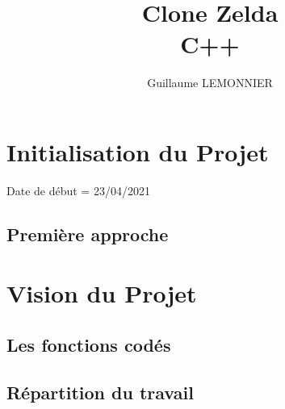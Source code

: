 \documentclass[a4paper,12pt]{article} %
\author{Guillaume LEMONNIER}
\title{Clone Zelda\\C++}
\begin{document}
\maketitle

\newpage

\tableofcontents

\newpage

\section{Initialisation du Projet}

Date de début = 23/04/2021

\subsection{Première approche}

\newpage

\section{Vision du Projet}

\subsection{Les fonctions codés}

\subsection{Répartition du travail}
\end{document}
